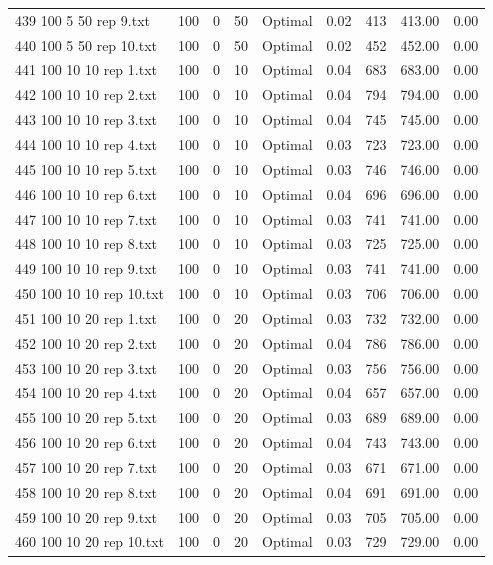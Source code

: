 \begin{longtable}{lrrllrrrr}
439 100 5 50 rep 9.txt & 100 & 0 & 50 & Optimal &  0.02 & 413 & 413.00 &  0.00\\
440 100 5 50 rep 10.txt & 100 & 0 & 50 & Optimal &  0.02 & 452 & 452.00 &  0.00\\
441 100 10 10 rep 1.txt & 100 & 0 & 10 & Optimal &  0.04 & 683 & 683.00 &  0.00\\
442 100 10 10 rep 2.txt & 100 & 0 & 10 & Optimal &  0.04 & 794 & 794.00 &  0.00\\
443 100 10 10 rep 3.txt & 100 & 0 & 10 & Optimal &  0.04 & 745 & 745.00 &  0.00\\
444 100 10 10 rep 4.txt & 100 & 0 & 10 & Optimal &  0.03 & 723 & 723.00 &  0.00\\
445 100 10 10 rep 5.txt & 100 & 0 & 10 & Optimal &  0.03 & 746 & 746.00 &  0.00\\
446 100 10 10 rep 6.txt & 100 & 0 & 10 & Optimal &  0.04 & 696 & 696.00 &  0.00\\
447 100 10 10 rep 7.txt & 100 & 0 & 10 & Optimal &  0.03 & 741 & 741.00 &  0.00\\
448 100 10 10 rep 8.txt & 100 & 0 & 10 & Optimal &  0.03 & 725 & 725.00 &  0.00\\
449 100 10 10 rep 9.txt & 100 & 0 & 10 & Optimal &  0.03 & 741 & 741.00 &  0.00\\
450 100 10 10 rep 10.txt & 100 & 0 & 10 & Optimal &  0.03 & 706 & 706.00 &  0.00\\
451 100 10 20 rep 1.txt & 100 & 0 & 20 & Optimal &  0.03 & 732 & 732.00 &  0.00\\
452 100 10 20 rep 2.txt & 100 & 0 & 20 & Optimal &  0.04 & 786 & 786.00 &  0.00\\
453 100 10 20 rep 3.txt & 100 & 0 & 20 & Optimal &  0.03 & 756 & 756.00 &  0.00\\
454 100 10 20 rep 4.txt & 100 & 0 & 20 & Optimal &  0.04 & 657 & 657.00 &  0.00\\
455 100 10 20 rep 5.txt & 100 & 0 & 20 & Optimal &  0.03 & 689 & 689.00 &  0.00\\
456 100 10 20 rep 6.txt & 100 & 0 & 20 & Optimal &  0.04 & 743 & 743.00 &  0.00\\
457 100 10 20 rep 7.txt & 100 & 0 & 20 & Optimal &  0.03 & 671 & 671.00 &  0.00\\
458 100 10 20 rep 8.txt & 100 & 0 & 20 & Optimal &  0.04 & 691 & 691.00 &  0.00\\
459 100 10 20 rep 9.txt & 100 & 0 & 20 & Optimal &  0.03 & 705 & 705.00 &  0.00\\
460 100 10 20 rep 10.txt & 100 & 0 & 20 & Optimal &  0.03 & 729 & 729.00 &  0.00\\

\end{longtable}
